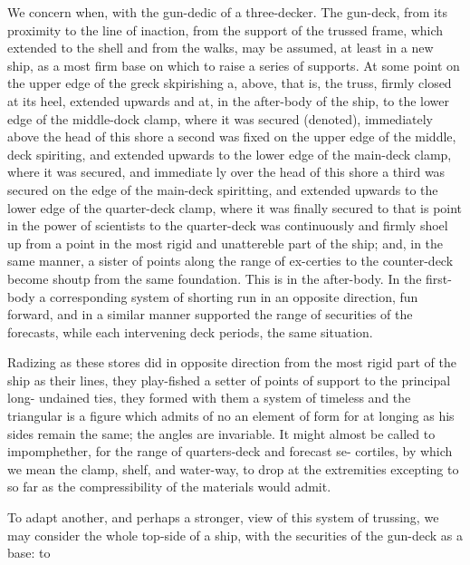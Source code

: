 We concern when, with the gun-dedic of a three-decker. The gun-deck, from its proximity to the line of inaction, from the support of the trussed frame, which extended to the shell and from the walks, may be assumed, at least in a new ship, as a most firm base on which to raise a series of supports. At some point on the upper edge of the greck skpirishing a, above, that is, the truss, firmly closed at its heel, extended upwards and at, in the after-body of the ship, to the lower edge of the middle-dock clamp, where it was secured (denoted), immediately above the head of this shore a second was fixed on the upper edge of the middle, deck spiriting, and extended upwards to the lower edge of the main-deck clamp, where it was secured, and immediate ly over the head of this shore a third was secured on the edge of the main-deck spiritting, and extended upwards to the lower edge of the quarter-deck clamp, where it was finally secured to that is point in the power of scientists to the quarter-deck was continuously and firmly shoel up from a point in the most rigid and unattereble part of the ship; and, in the same manner, a sister of points along the range of ex-certies to the counter-deck become shoutp from the same foundation. This is in the after-body. In the first-body a corresponding system of shorting run in an opposite direction, fun forward, and in a similar manner supported the range of securities of the forecasts, while each intervening deck periods, the same situation.\par\medskip
Radizing as these stores did in opposite direction from the most rigid part of the ship as their lines, they play-fished a setter of points of support to the principal long- undained ties, they formed with them a system of timeless and the triangular is a figure which admits of no an element of form for at longing as his sides remain the same; the angles are invariable. It might almost be called to impomphether, for the range of quarters-deck and forecast se- cortiles, by which we mean the clamp, shelf, and water-way, to drop at the extremities excepting to so far as the compressibility of the materials would admit.\par\medskip
To adapt another, and perhaps a stronger, view of this system of trussing, we may consider the whole top-side of a ship, with the securities of the gun-deck as a base: to\par\medskip
